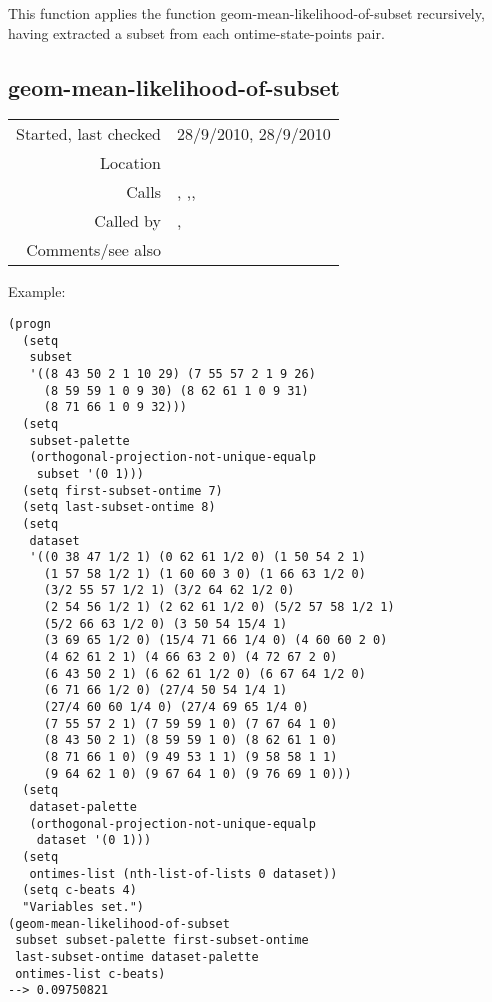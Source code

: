 \noindent This function applies the function
geom-mean-likelihood-of-subset recursively, having
extracted a subset from each ontime-state-points
pair.


\subsection*{geom-mean-likelihood-of-subset}\label{fun:geom-mean-likelihood-of-subset}

\vspace{0.3cm}
\begin{tabular}{r|p{8cm}}
Started, last checked & 28/9/2010, 28/9/2010 \\
Location & \nameref{sec:generating-beat-MNN-spacing-forwards} \\
Calls & \nameref{fun:empirical-mass}, \nameref{fun:index-1st-sublist-item>=},\newline \nameref{fun:index-1st-sublist-item>}, \nameref{fun:likelihood-of-subset} \\
Called by & \nameref{fun:comparable-likelihood-profilep},\newline \nameref{fun:geom-mean-likelihood-of-states} \\
Comments/see also & 
\end{tabular}

\vspace{0.5cm}
\noindent Example:
\begin{verbatim}
(progn
  (setq
   subset
   '((8 43 50 2 1 10 29) (7 55 57 2 1 9 26)
     (8 59 59 1 0 9 30) (8 62 61 1 0 9 31)
     (8 71 66 1 0 9 32)))
  (setq
   subset-palette
   (orthogonal-projection-not-unique-equalp
    subset '(0 1)))
  (setq first-subset-ontime 7)
  (setq last-subset-ontime 8)
  (setq
   dataset
   '((0 38 47 1/2 1) (0 62 61 1/2 0) (1 50 54 2 1)
     (1 57 58 1/2 1) (1 60 60 3 0) (1 66 63 1/2 0)
     (3/2 55 57 1/2 1) (3/2 64 62 1/2 0)
     (2 54 56 1/2 1) (2 62 61 1/2 0) (5/2 57 58 1/2 1)
     (5/2 66 63 1/2 0) (3 50 54 15/4 1)
     (3 69 65 1/2 0) (15/4 71 66 1/4 0) (4 60 60 2 0)
     (4 62 61 2 1) (4 66 63 2 0) (4 72 67 2 0)
     (6 43 50 2 1) (6 62 61 1/2 0) (6 67 64 1/2 0)
     (6 71 66 1/2 0) (27/4 50 54 1/4 1)
     (27/4 60 60 1/4 0) (27/4 69 65 1/4 0)
     (7 55 57 2 1) (7 59 59 1 0) (7 67 64 1 0)
     (8 43 50 2 1) (8 59 59 1 0) (8 62 61 1 0)
     (8 71 66 1 0) (9 49 53 1 1) (9 58 58 1 1)
     (9 64 62 1 0) (9 67 64 1 0) (9 76 69 1 0)))
  (setq
   dataset-palette
   (orthogonal-projection-not-unique-equalp
    dataset '(0 1)))
  (setq
   ontimes-list (nth-list-of-lists 0 dataset))
  (setq c-beats 4)
  "Variables set.")
(geom-mean-likelihood-of-subset
 subset subset-palette first-subset-ontime
 last-subset-ontime dataset-palette
 ontimes-list c-beats)
--> 0.09750821
\end{verbatim}


